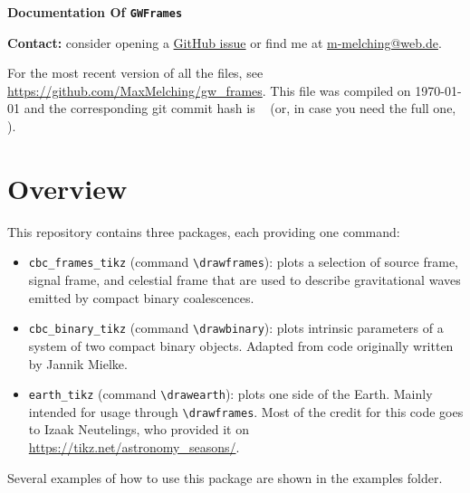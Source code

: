 \documentclass[
    DIV=11,
    BCOR=0mm,
    paper=a4,
    fontsize=11pt,
    twoside=false,
    titlepage=true
]{scrartcl}
\newcommand{\code}[1]{\textcolor{codecolor}{\texttt{#1}}}
\newcommand{\gitrevision}{%
  \StrLeft{\HEAD}{7}%
}
\begin{document}
{\noindent\rmfamily\Huge\bfseries
    Documentation Of \code{GWFrames}
}

\begin{center}
    \textbf{Contact:} consider opening a \href{https://github.com/MaxMelching/minkowski_diagram/issues}{GitHub issue} or find me at \href{mailto:m-melching@web.de}{m-melching@web.de}.
\end{center}


For the most recent version of all the files, see \url{https://github.com/MaxMelching/gw_frames}.
This file was compiled on \today{} and the corresponding git commit hash
is \code{\gitrevision{}} (or, in case you need the full one, \code{\HEAD{}}\hspace{-0.5em}).



    \section{Overview}

This repository contains three packages, each providing one command:
\begin{itemize}
    \item \code{cbc\_frames\_tikz} (command \verb|\drawframes|): plots a
    selection of source frame, signal frame, and celestial frame that are
    used to describe gravitational waves emitted by compact binary coalescences.
    
    
    \item \code{cbc\_binary\_tikz} (command \verb|\drawbinary|): plots
    intrinsic parameters of a system of two compact binary objects. Adapted
    from code originally written by Jannik Mielke.
    
    
    \item \code{earth\_tikz} (command \verb|\drawearth|): plots one side of
    the Earth. Mainly intended for usage through \verb|\drawframes|. Most of
    the credit for this code goes to Izaak Neutelings, who provided it on
    \url{https://tikz.net/astronomy_seasons/}.
\end{itemize}

Several examples of how to use this package are shown in the examples folder.


\end{document}
